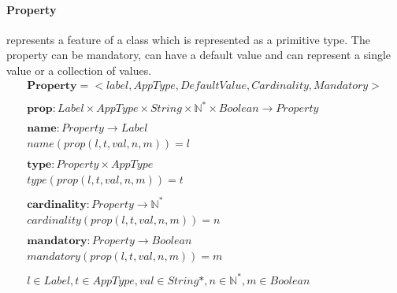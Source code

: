 \documentclass[11pt]{article}
\begin{document}
	 

\paragraph{Property} represents a feature of  a class which is represented as a primitive type. The property can be mandatory, can have a default value and can represent a single value or a collection of values.
\begin{align*}
	\mathbf{Property} = <label, AppType, DefaultValue, Cardinality, Mandatory> \\ \\
	\mathbf{prop} : Label \times AppType \times String \times \mathbb{N^{*}} \times Boolean \rightarrow Property \\ \\
	\mathbf{name} : Property \rightarrow Label \\
	name(prop(l, t, val, n, m)) = l \\ \\
	\mathbf{type} : Property \times AppType \\
	type(prop(l, t, val, n, m)) = t \\ \\
	\mathbf{cardinality} : Property \rightarrow \mathbb{N^{*}} \\
	cardinality(prop(l, t, val, n, m)) = n \\ \\
	\mathbf{mandatory} : Property \rightarrow Boolean \\
	mandatory(prop(l, t, val, n, m)) = m  \\ \\
l \in Label, t \in AppType, val \in String*, n \in \mathbb{N^{*}}, m \in Boolean
\end{align*}


\end{document}
